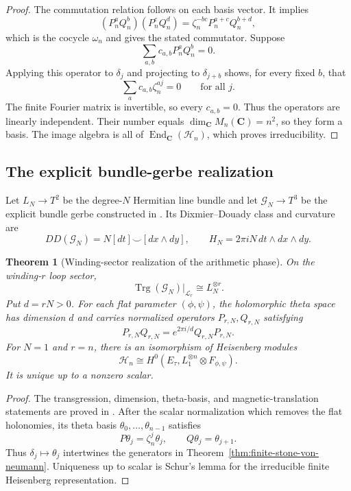 \documentclass[11pt]{amsart}
\numberwithin{equation}{section}
\newtheorem{theorem}{Theorem}[section]
\theoremstyle{definition}
\newcommand{\C}{\mathbf C}
\newcommand{\End}{\operatorname{End}}
\newcommand{\Trg}{\operatorname{Trg}}
\begin{document}
\begin{proof}
The commutation relation follows on each basis vector.  It implies
\[
(P_n^aQ_n^b)(P_n^cQ_n^d)
=\zeta_n^{-bc}P_n^{a+c}Q_n^{b+d},
\]
which is the cocycle $\omega_n$ and gives the stated commutator.  Suppose
\[
\sum_{a,b}c_{a,b}P_n^aQ_n^b=0.
\]
Applying this operator to $\delta_j$ and projecting to
$\delta_{j+b}$ shows, for every fixed $b$, that
\[
\sum_a c_{a,b}\zeta_n^{aj}=0
\qquad\text{for all }j.
\]
The finite Fourier matrix is invertible, so every $c_{a,b}=0$.  Thus the
operators are linearly independent.  Their number equals
$\dim_\C M_n(\C)=n^2$, so they form a basis.  The image algebra is all of
$\End_\C(\mathscr H_n)$, which proves irreducibility.
\end{proof}

\subsection{The explicit bundle-gerbe realization}

Let $L_N\to T^2$ be the degree-$N$ Hermitian line bundle and let
$\mathcal G_N\to T^3$ be the explicit bundle gerbe constructed in
\cite{GerbeTheta}.  Its Dixmier--Douady class and curvature are
\[
DD(\mathcal G_N)
=N[dt]\smile[dx\wedge dy],
\qquad
H_N=2\pi iN\,dt\wedge dx\wedge dy.
\]

\begin{theorem}[Winding-sector realization of the arithmetic phase]
\label{thm:winding-theta-realization}
On the winding-$r$ loop sector,
\[
\Trg(\mathcal G_N)|_{\mathcal L_r}
\cong L_N^{\otimes r}.
\]
Put $d=rN>0$.  For each flat parameter $(\phi,\psi)$, the holomorphic
theta space has dimension $d$ and carries normalized operators
$P_{r,N},Q_{r,N}$ satisfying
\[
P_{r,N}Q_{r,N}=e^{2\pi i/d}Q_{r,N}P_{r,N}.
\]
For $N=1$ and $r=n$, there is an isomorphism of Heisenberg modules
\[
\boxed{
\mathscr H_n
\cong
H^0(E_\tau,L_1^{\otimes n}\otimes F_{\phi,\psi}).
}
\]
It is unique up to a nonzero scalar.
\end{theorem}

\begin{proof}
The transgression, dimension, theta-basis, and magnetic-translation
statements are proved in \cite{GerbeTheta}.  After the scalar
normalization which removes the flat holonomies, its theta basis
$\theta_0,\dots,\theta_{n-1}$ satisfies
\[
P\theta_j=\zeta_n^j\theta_j,
\qquad
Q\theta_j=\theta_{j+1}.
\]
Thus $\delta_j\mapsto\theta_j$ intertwines the generators in
Theorem~\ref{thm:finite-stone-von-neumann}.  Uniqueness up to scalar is
Schur's lemma for the irreducible finite Heisenberg representation.
\end{proof}
\end{document}
